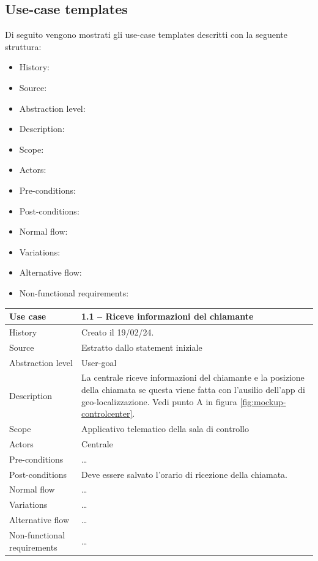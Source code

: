\documentclass{article}
\begin{document}
    \subsection{Use-case templates}
    Di seguito vengono mostrati gli use-case templates descritti con la seguente struttura:
    \begin{itemize}
        \item History:
        \item Source:
        \item Abstraction level:
        \item Description:
        \item Scope:
        \item Actors:
        \item Pre-conditions:
        \item Post-conditions:
        \item Normal flow:
        \item Variations:
        \item Alternative flow:
        \item Non-functional requirements:
    \end{itemize}
    \def\graycolor{gray!15}
    \def\creationDate{Creato il 19/02/24.\space}
    \begin{table}[!h]
        \rowcolors{2}{\graycolor}{white}
        \begin{tabularx}{\textwidth}{l|X}
            Use case & \textbf{1.1 – Riceve informazioni del chiamante} \\
            \hline
            History & \creationDate \\
            Source & Estratto dallo statement iniziale \\
            Abstraction level & User-goal \\
            Description & La centrale riceve informazioni del chiamante e la posizione della chiamata se questa viene fatta con l’ausilio dell’app di geo-localizzazione. Vedi punto A in figura \ref{fig:mockup-controlcenter}.\\
            Scope & Applicativo telematico della sala di controllo \\
            Actors & Centrale \\
            Pre-conditions & \dots \\
            Post-conditions & Deve essere salvato l’orario di ricezione della chiamata. \\
            Normal flow & \dots \\
            Variations & \dots \\
            Alternative flow & \dots \\
            Non-functional requirements & \dots
        \end{tabularx}
        \label{tab:usecase1.1}
    \end{table}
\end{document}
